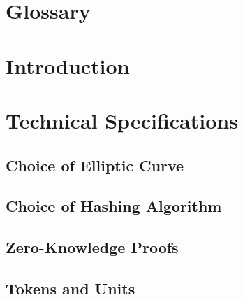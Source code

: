 \documentclass[a4paper, 12pt]{book}
\begin{document}
\chapter*{Glossary} \label{Cha:Glo}





\chapter*{Introduction} \label{Cha:Int}
 

 
 
\chapter{Technical Specifications} \label{Cha:Tec}



\section{Choice of Elliptic Curve}\label{Sec:EC}



\section{Choice of Hashing Algorithm}\label{Sec:Has}



\section{Zero-Knowledge Proofs}\label{Sec:ZKP}



\section{Tokens and Units}\label{Sec:Tok}
\end{document}
